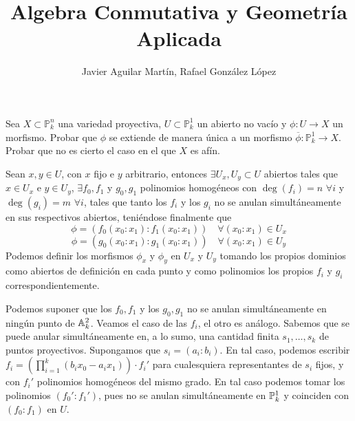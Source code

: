 \documentclass[twoside]{article}
\begin{document}
\title{Algebra Conmutativa y Geometría Aplicada}
\author{Javier Aguilar Martín, Rafael González López}
\maketitle
\begin{ejercicio}{2} Sea $X \subset \mathbb{P}^n_k$ una variedad proyectiva, $U\subset \mathbb{P}^1_k$ un abierto no vacío y $\phi\colon U\rightarrow X$ un morfismo. Probar que $\phi$ se extiende de manera única a un morfismo $\overline{\phi}\colon \mathbb{P}^1_k\rightarrow X$. Probar que no es cierto el caso en el que $X$ es afín.
\end{ejercicio}
\begin{solucion} 
Sean $x,y\in U$, con $x$ fijo e $y$ arbitrario, entonces $\exists U_x,U_y \subset U$ abiertos tales que $x\in U_x$ e $y\in U_y$, $\exists f_0,f_1$ y $g_0,g_1$ polinomios homogéneos con $\deg(f_i)=n$ $\forall i$ y $\deg(g_i)=m$ $\forall i$, tales que tanto los $f_i$ y los $g_i$ no se anulan simultáneamente en sus respectivos abiertos, teniéndose finalmente que 
$$\phi =(f_0(x_0:x_1):f_1(x_0:x_1)) \quad \forall (x_0:x_1) \in U_x$$ 
$$\phi = (g_0(x_0:x_1):g_1(x_0:x_1)) \quad \forall (x_0:x_1) \in U_y$$
Podemos definir los morfismos $\phi_x$ y $\phi_y$ en $U_x$ y $U_y$ tomando  los propios dominios como abiertos de definición en cada punto y como polinomios los propios $f_i$ y $g_i$ correspondientemente. 

Podemos suponer que los $f_0,f_1$ y los $g_0,g_1$ no se anulan simultáneamente en ningún punto de $\mathbb{A}^2_k$. Veamos el caso de las $f_i$, el otro es análogo. Sabemos que se puede anular simultáneamente en, a lo sumo, una cantidad finita $s_1,\dotsc,s_k$ de puntos proyectivos. Supongamos que $s_i = (a_i:b_i)$. En tal caso, podemos escribir $f_i = \left(\prod_{i=1}^k (b_ix_0-a_ix_1)\right)\cdot f_i'$ para cualesquiera representantes de $s_i$ fijos, y con $f_i'$ polinomios homogéneos del mismo grado. En tal caso podemos tomar los polinomios $(f_0':f_1')$, pues no se anulan simultáneamente en $\mathbb{P}^1_k$ y coinciden con $(f_0:f_1)$ en $U$. 


\end{solucion}
\end{document}
